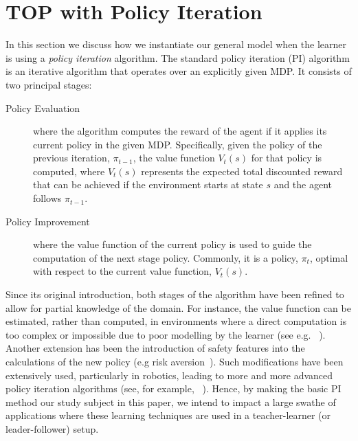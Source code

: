 
\section{TOP with Policy Iteration}\label{sec: TOP-PI}

In this section we discuss how we instantiate our general model when
the learner is using a \emph{policy iteration} algorithm.  The
standard policy iteration (PI) algorithm is an iterative algorithm
that operates over an explicitly given MDP\cite{puterman_book_94}.  It
consists of two principal stages:
\begin{description}
\item[Policy Evaluation] where the algorithm computes the reward of
  the agent if it applies its current policy in the given
  MDP. Specifically, given the policy of the previous iteration,
  $\pi_{t-1}$, the value function $V_t(s)$ for that policy is
  computed, where $V_t(s)$ represents the expected total discounted
  reward that can be achieved if the environment starts at state $s$
  and the agent follows $\pi_{t-1}$.

\item[Policy Improvement]  where the value function
of the current policy is used to guide the computation of the next
stage policy. Commonly, it is a policy, $\pi_{t}$, optimal with
respect to the current value function, $V_t(s)$.
\end{description}


Since its original introduction, both stages of the algorithm have
been refined to allow for partial knowledge of the domain.  For
instance, the value function can be estimated, rather than computed,
in environments where a direct computation is too complex or
impossible due to poor modelling by the learner (see
e.g. ~\cite{vanRoy_98,koller_parr_2000,lagoudakis_parr_2003}). Another
extension has been the introduction of safety features into the
calculations of the new policy (e.g risk
aversion~\cite{howard_metheson_72,marcus_et_al_97,sato_kobayashi_2000}). Such
modifications have been extensively used, particularly in robotics,
leading to more and more advanced policy iteration algorithms (see,
for example, ~\cite{sugiyama_et_al_2009,lagoudakis_parr_2003}). Hence,
by making the basic PI method our study subject in this paper, we
intend to impact a large swathe of applications where these learning
techniques are used in a teacher-learner (or leader-follower) setup.


